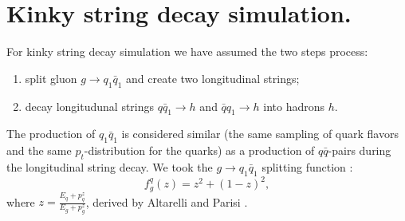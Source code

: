 \section{Kinky string decay simulation.}

\hspace{1.0em}
For kinky string decay simulation we have assumed the two steps process:
\begin{enumerate}
\item split gluon $g\rightarrow q_1 \bar{q}_1$ and create two longitudinal 
strings;
\item decay longitudunal strings $q\bar{q}_1 \rightarrow h$ and
 $\bar{q}q_1 \rightarrow h$ into hadrons $h$.
\end{enumerate}
The production of $q_1\bar{q}_1$ is considered similar (the same sampling of 
quark flavors and the same $p_t$-distribution for the quarks) as a production 
of $q\bar{q}$-pairs during the longitudinal string decay. 
We took the $g\rightarrow q_1\bar{q}_1$ splitting function \cite{APKW80}:
\begin{equation}
\label{KSD1}f^{q}_{g}(z)=z^2+(1-z)^2,
\end{equation}
where $z=\frac{E_q+p^z_q}{E_g+p^z_g}$, derived by Altarelli and 
Parisi \cite{AP77}. 
